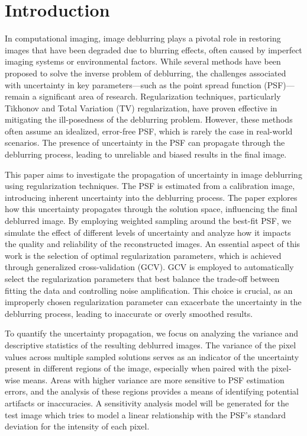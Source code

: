 \documentclass[letterpaper, 11pt, titlepage, twocolumn]{article}
\begin{document}
\tableofcontents
\newpage

\section{Introduction}
In computational imaging, image deblurring plays a pivotal role in restoring images that have been degraded due to blurring effects, often caused by imperfect imaging systems or environmental factors. While several methods have been proposed to solve the inverse problem of deblurring, the challenges associated with uncertainty in key parameters—such as the point spread function (PSF)—remain a significant area of research. Regularization techniques, particularly Tikhonov and Total Variation (TV) regularization, have proven effective in mitigating the ill-posedness of the deblurring problem. However, these methods often assume an idealized, error-free PSF, which is rarely the case in real-world scenarios. The presence of uncertainty in the PSF can propagate through the deblurring process, leading to unreliable and biased results in the final image.

This paper aims to investigate the propagation of uncertainty in image deblurring using regularization techniques.  The PSF is estimated from a calibration image, introducing inherent uncertainty into the deblurring process. The paper explores how this uncertainty propagates through the solution space, influencing the final deblurred image. By employing weighted sampling around the best-fit PSF, we simulate the effect of different levels of uncertainty and analyze how it impacts the quality and reliability of the reconstructed images. An essential aspect of this work is the selection of optimal regularization parameters, which is achieved through generalized cross-validation (GCV). GCV is employed to automatically select the regularization parameters that best balance the trade-off between fitting the data and controlling noise amplification. This choice is crucial, as an improperly chosen regularization parameter can exacerbate the uncertainty in the deblurring process, leading to inaccurate or overly smoothed results. 

To quantify the uncertainty propagation, we focus on analyzing the variance and descriptive statistics of the resulting deblurred images. The variance of the pixel values across multiple sampled solutions serves as an indicator of the uncertainty present in different regions of the image, especially when paired with the pixel-wise means. Areas with higher variance are more sensitive to PSF estimation errors, and the analysis of these regions provides a means of identifying potential artifacts or inaccuracies. A sensitivity analysis model will be generated for the test image which tries to model a linear relationship with the PSF's standard deviation for the intensity of each pixel.
\end{document}
